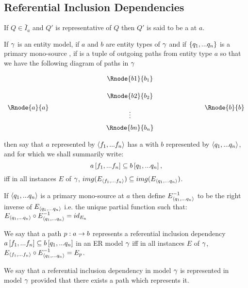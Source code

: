 \subsection{Referential Inclusion Dependencies}
\begin{definition}
If $Q \in \bar{I}_a$ and $Q'$ is representative of $Q$ then $Q'$ is said to be
a  at $a$. 
\end{definition}

\begin{definition}
If $\gamma$ is an entity model, 
if $a$ and $b$ are entity types of  $\gamma$ and  if $\left\{q_1,...q_n\right\}$
is a primary mono-source ,
if \fntuple is a tuple of outgoing paths from entity type $a$  
so that we have the following diagram of paths in $\gamma$
\setlength{\arraycolsep}{.2cm}
\begin{center}
$
\begin{array}{cp{2cm}ccp{2cm}c}
             & &         & \Rnode{b1}{b_1} &&               \\ [0.5cm]
						 & &         & \Rnode{b2}{b_2} &&               \\ [0.2cm]
\Rnode{a}{a} & &         &                 &&  \Rnode{b}{b} \\ [-0.2cm]						
             & &         &    \vdots       &&               \\ [0.2cm]
             & &         & \Rnode{bn}{b_n} &&               \\ 
\end{array}
$
\end{center}
then say that $a$ represented by $\langle f_1,...f_n\rangle$ 
has a  with $b$ represented by $\langle q_1,...q_n\rangle$, and for which we shall summarily write:
$$
a\left[f_1,...f_n\right]\subseteq b\left[q_1,...q_n\right],
$$
iff in all instances $E$ of $\gamma$,
$img(E_{\langle f_1,...f_n\rangle}) \subseteq img(E_{\langle q_1,...q_n\rangle})$. 
\end{definition}

If $\langle q_1,...q_n\rangle$ is a primary mono-source at $a$ then define $E_{\langle q_1,...q_n\rangle}^{-1}$ to be the right inverse of
$E_{\langle q_1,...q_n\rangle}$ i.e. the unique partial function such that:
$E_{\langle q_1,...q_n\rangle} \circ E_{\langle q_1,...q_n\rangle}^{-1} = id_{E_a}$

\begin{definition}
We say that a path $p:a \rightarrow b$ represents a referential inclusion dependency
$a\left[f_1,...f_n\right]\subseteq b\left[q_1,...q_n\right]$  in an ER model $\gamma$ iff
  in all instances $E$ of $\gamma$, $E_{\langle f_1,...f_n\rangle} \circ E_{\langle q_1,...q_n\rangle}^{-1}=E_p$.
\end{definition}
We say that a referential inclusion dependency in model $\gamma$ is represented in model $\gamma$ provided that
there exists a path which represents it. 

